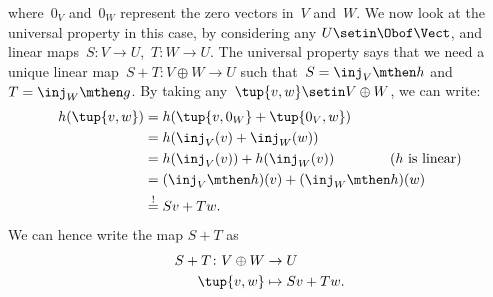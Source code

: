 \begin{example}
\begin{equation}
    \end{equation}
    where~$0_V$ and~$0_W$ represent the zero vectors in~$V$ and~$W$.
    We now look at the universal property in this case, by considering any  $U\setin \Obof\Vect$, and linear maps~$S\colon V\to U$,~$T\colon W\to U$.
    The universal property says that we need a unique linear map~$S+T\colon V\oplus W \to U$ such that~$S=\inj_V\mthen h$ and~$T=\inj_W\mthen g$.
    By taking any~$\tup{v,w}\setin V\oplus W$, we can write:
    \begin{equation}
        \begin{aligned}
            h(\tup{v,w}) & =h(\tup{v,0_W}+\tup{0_V,w}) \\
                         & =h(\inj_V(v)+\inj_W(w)) \\
                         & =h(\inj_V(v))+h(\inj_W(v)) \qquad \qquad (h \text{ is linear}) \\
                         & =(\inj_V\mthen h)(v)+(\inj_W\mthen h)(w) \\
                         & \overset{!
            }{=}
            Sv+Tw.
        \end{aligned}
    \end{equation}
    We can hence write the map $S+T$ as
    \begin{equation}
        \begin{aligned}
            S+T\colon V\oplus W & \to U \\
            \tup{v,w}           & \mapsto Sv+Tw.
        \end{aligned}
    \end{equation}
\end{example}
